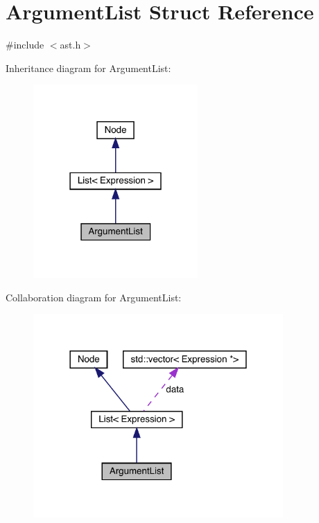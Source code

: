 \hypertarget{struct_argument_list}{}\section{Argument\+List Struct Reference}
\label{struct_argument_list}


{\ttfamily \#include $<$ast.\+h$>$}



Inheritance diagram for Argument\+List\+:\nopagebreak
\begin{figure}[H]
\begin{center}
\leavevmode
\includegraphics[width=178pt]{struct_argument_list__inherit__graph}
\end{center}
\end{figure}


Collaboration diagram for Argument\+List\+:\nopagebreak
\begin{figure}[H]
\begin{center}
\leavevmode
\includegraphics[width=270pt]{struct_argument_list__coll__graph}
\end{center}
\end{figure}
